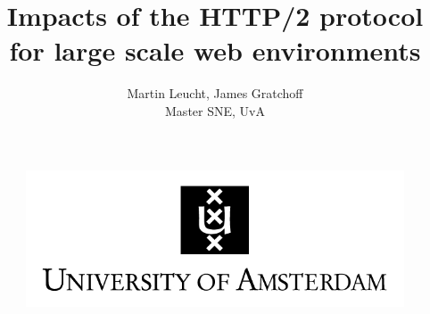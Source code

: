 \documentclass{article}
\begin{document}
 
\begin{figure}[!bh]
 	\begin{center}
		\huge \title{Impacts of the HTTP/2 protocol for large scale web environments}
		\author{Martin Leucht, James Gratchoff \\
		Master SNE, UvA} 
		\includegraphics{images/uva.jpeg}
	\maketitle 
		\label{sec:uva}
	\end{center}
\end{figure}
\setlength{\columnsep}{2cm}
\def\columnseprulecolor{\color{blue}}
 
\newpage
\tableofcontents
\end{document}
